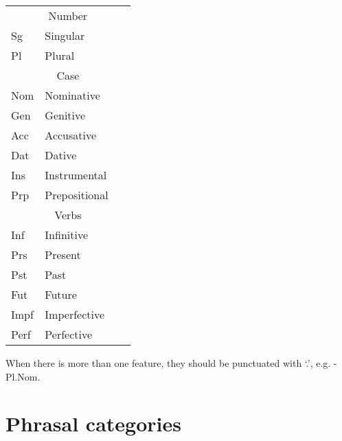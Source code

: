 \documentclass[a4paper,11pt, onecolumn,twoside]{article}
\begin{document}
\begin{tabular}{lll}
\multicolumn{3}{c}{Number} \\
Sg  & Singular & ~ \\
Pl  & Plural & ~ \\

\multicolumn{3}{c}{Case} \\
Nom & Nominative & ~ \\
Gen & Genitive & ~ \\
Acc & Accusative & ~ \\
Dat & Dative & ~ \\
Ins & Instrumental & ~ \\
Prp & Prepositional & ~ \\

\multicolumn{3}{c}{Verbs} \\
Inf & Infinitive & ~ \\
Prs & Present   & ~ \\
Pst & Past & ~ \\
Fut & Future    & ~ \\
Impf & Imperfective & ~ \\
Perf & Perfective & ~ \\

\end{tabular}

When there is more than one feature, they should be punctuated with `.', e.g. -Pl.Nom.

\section{Phrasal categories}
\end{document}
